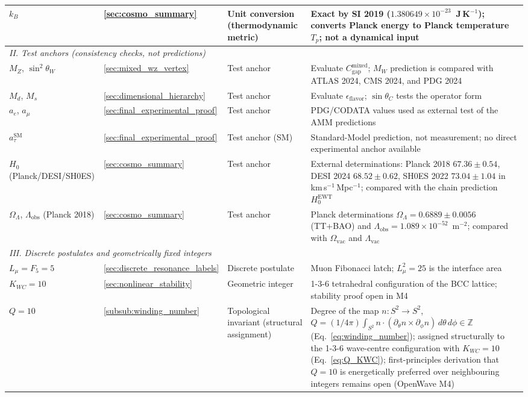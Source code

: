 \documentclass[10pt,a4paper]{article}
\begin{document}
{\begin{longtable}{@{}p{3.2cm}p{1.8cm}p{2.6cm}p{6.0cm}@{}}
		$k_B$ & \ref{sec:cosmo_summary} & Unit conversion (thermodynamic metric) & Exact by SI 2019 ($1.380649 \times 10^{-23}$~J\,K$^{-1}$); converts Planck energy to Planck temperature $T_p$; not a dynamical input \\
		\midrule
		\multicolumn{4}{l}{\textit{II. Test anchors (consistency checks, not predictions)}} \\
		\midrule
		$M_Z$, $\sin^2\theta_W$ & \ref{sec:mixed_wz_vertex} & Test anchor & Evaluate $C_{\text{gap}}^{\text{mixed}}$; $M_W$ prediction is compared with ATLAS 2024, CMS 2024, and PDG 2024 \\
		$M_d$, $M_s$ & \ref{sec:dimensional_hierarchy} & Test anchor & Evaluate $\epsilon_{\text{flavor}}$; $\sin\theta_C$ tests the operator form \\
		$a_e$, $a_\mu$ & \ref{sec:final_experimental_proof} & Test anchor & PDG/CODATA values used as external test of the AMM predictions \\
		$a_\tau^{\text{SM}}$ & \ref{sec:final_experimental_proof} & Test anchor (SM) & Standard-Model prediction, not measurement; no direct experimental anchor available \\
		$H_0$ (Planck/DESI/SH0ES) & \ref{sec:cosmo_summary} & Test anchor & External determinations: Planck 2018 $67.36 \pm 0.54$, DESI 2024 $68.52 \pm 0.62$, SH0ES 2022 $73.04 \pm 1.04$ in km\,s$^{-1}$\,Mpc$^{-1}$; compared with the chain prediction $H_0^{\text{EWT}}$ \\
		$\Omega_\Lambda$, $\Lambda_{\text{obs}}$ (Planck 2018) & \ref{sec:cosmo_summary} & Test anchor & Planck determinations $\Omega_\Lambda = 0.6889 \pm 0.0056$ (TT+BAO) and $\Lambda_{\text{obs}} = 1.089 \times 10^{-52}$~m$^{-2}$; compared with $\Omega_{\text{vac}}$ and $\Lambda_{\text{vac}}$ \\
		\midrule
		\multicolumn{4}{l}{\textit{III. Discrete postulates and geometrically fixed integers}} \\
		\midrule
		$L_\mu = F_5 = 5$ & \ref{sec:discrete_resonance_labels} & Discrete postulate & Muon Fibonacci latch; $L_\mu^2 = 25$ is the interface area \\
		$K_{WC} = 10$ & \ref{sec:nonlinear_stability} & Geometric integer & 1-3-6 tetrahedral configuration of the BCC lattice; stability proof open in M4 \\
		$Q = 10$ & \ref{subsub:winding_number} & Topological invariant (structural assignment) & Degree of the map $n: S^2 \to S^2$, $Q = (1/4\pi)\int_{S^2} n\cdot(\partial_\theta n \times \partial_\phi n)\,d\theta\,d\phi \in \mathbb{Z}$ (Eq.~\ref{eq:winding_number}); assigned structurally to the 1-3-6 wave-centre configuration with $K_{WC} = 10$ (Eq.~\ref{eq:Q_KWC}); first-principles derivation that $Q=10$ is energetically preferred over neighbouring integers remains open (OpenWave M4) \\

\end{longtable}}
\end{document}
